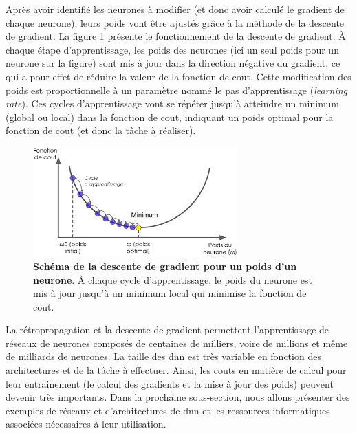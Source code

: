 Après avoir identifié les neurones à modifier (et donc avoir calculé le gradient de chaque neurone), leurs poids vont être ajustés grâce à la méthode de la descente de gradient. La figure \ref{fig:grad_descent} présente le fonctionnement de la descente de gradient. À chaque étape d'apprentissage, les poids des neurones (ici un seul poids pour un neurone sur la figure) sont mis à jour dans la direction négative du gradient, ce qui a pour effet de réduire la valeur de la fonction de cout. Cette modification des poids est proportionnelle à un paramètre nommé le pas d'apprentissage (\textit{learning rate}). Ces cycles d'apprentissage vont se répéter jusqu'à atteindre un minimum (global ou local) dans la fonction de cout, indiquant un poids optimal pour la fonction de cout (et donc la tâche à réaliser).
\begin{figure}[!htbp]
 \centering
 \includegraphics[width=0.7\textwidth]{figures/gradient_descent.png}
 \caption[Schéma de la descente de gradient pour un poids d'un neurone]{\textbf{Schéma de la descente de gradient pour un poids d'un neurone}. À chaque cycle d'apprentissage, le poids du neurone est mis à jour jusqu'à un minimum local qui minimise la fonction de cout.}
 \label{fig:grad_descent}
\end{figure}


La rétropropagation et la descente de gradient permettent l'apprentissage de réseaux de neurones composés de centaines de milliers, voire de millions et même de milliards de neurones. La taille des \gls{dnn} est très variable en fonction des architectures et de la tâche à effectuer. Ainsi, les couts en matière de calcul pour leur entrainement (le calcul des gradients et la mise à jour des poids) peuvent devenir très importants. Dans la prochaine sous-section, nous allons présenter des exemples de réseaux et d'architectures de \gls{dnn} et les ressources informatiques associées nécessaires à leur utilisation.

